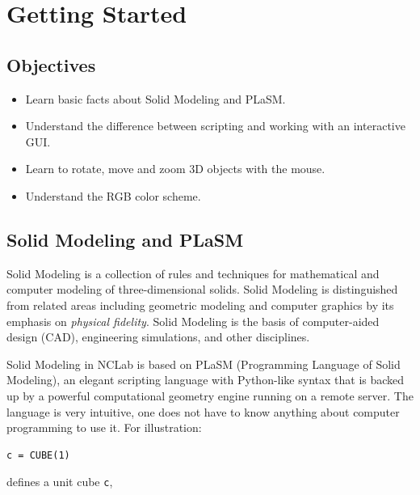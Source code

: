 
\pagestyle{plain}
\setcounter{page}{1}

\section{Getting Started}

\subsection{Objectives}
\begin{itemize}
\item Learn basic facts about Solid Modeling and PLaSM.
\item Understand the difference between scripting and working with an interactive GUI.
\item Learn to rotate, move and zoom 3D objects with the mouse.
\item Understand the RGB color scheme.
\end{itemize}

\subsection{Solid Modeling and PLaSM}

Solid Modeling is a collection of rules and techniques for mathematical and computer 
modeling of three-dimensional solids. Solid Modeling is distinguished from related 
areas including geometric modeling and computer graphics by its emphasis on {\em physical fidelity}.
Solid Modeling is the basis of computer-aided design (CAD), engineering simulations, and other disciplines.

Solid Modeling in NCLab is based on PLaSM (Programming Language 
of Solid Modeling), an elegant scripting language with Python-like 
syntax that is backed up by a powerful computational geometry 
engine running on a remote server. The language is very intuitive, 
one does not have to know anything about computer programming 
to use it. For illustration:\\

\begin{bbox}
\begin{verbatim}
c = CUBE(1)
\end{verbatim}
\end{bbox}
\vspace{6mm}

\noindent
defines a unit cube {\tt c},\\

